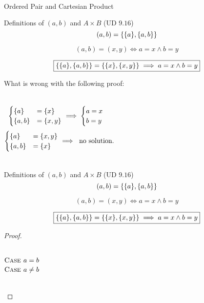 \begin{frame}{}
  \centerline{\LARGE Ordered Pair and Cartesian Product}

  \vspace{0.60cm}
\end{frame}

\begin{frame}{}
  \begin{exampleblock}{Definitions of $(a,b)$ and $A \times B$ (UD $9.16$)}
    \[
      (a, b) = \{\{a\}, \{a,b\}\}
    \]

    \[
      (a,b) = (x,y) \iff a = x \land b = y
    \]
  \end{exampleblock}

  \[
    \boxed{\{\{a\}, \{a,b\}\} = \{\{x\}, \{x,y\}\} \implies a = x \land b = y}
  \]

  \vspace{0.50cm}
  What is wrong with the following proof:
  \begin{columns}
      \begin{equation*}
	\begin{cases}
	  \{a\} &= \{x\} \\
	  \{a,b\} &= \{x,y\}
	\end{cases}
	\implies \begin{cases}
	    a = x \\
	    b = y
	  \end{cases}
      \end{equation*}
      \[
	\begin{cases}
	  \{a\} &= \{x,y\} \\
	  \{a,b\} &= \{x\}
	\end{cases}
	\implies \text{ no solution.}
      \]
  \end{columns}
\end{frame}

\begin{frame}{}
  \begin{exampleblock}{Definitions of $(a,b)$ and $A \times B$ (UD $9.16$)}
    \[
      (a, b) = \{\{a\}, \{a,b\}\}
    \]

    \[
      (a,b) = (x,y) \iff a = x \land b = y
    \]
  \end{exampleblock}

  \[
    \boxed{\{\{a\}, \{a,b\}\} = \{\{x\}, \{x,y\}\} \implies a = x \land b = y}
  \]

  \vspace{0.50cm}
  \begin{proof}
    \begin{columns}
        \[
	  \textsc{Case } a = b
	\]
        \[
	  \textsc{Case } a \neq b
	\]
    \end{columns}
  \end{proof}
\end{frame}

